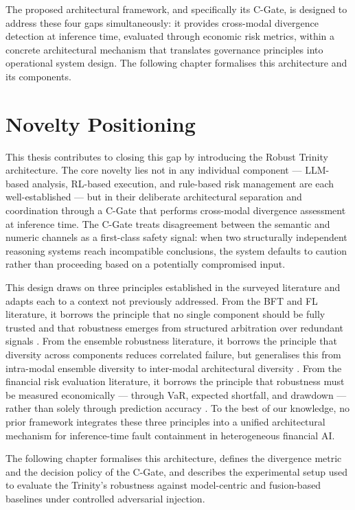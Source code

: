 The proposed architectural framework, and specifically its C-Gate, is designed
to address these four gaps simultaneously: it provides cross-modal divergence
detection at inference time, evaluated through economic risk metrics, within a
concrete architectural mechanism that translates governance principles into
operational system design. The following chapter formalises this architecture and
its components.

\section{Novelty Positioning}

This thesis contributes to closing this gap by introducing the Robust Trinity
architecture. The core novelty lies not in any individual component --- LLM-based
analysis, RL-based execution, and rule-based risk management are each
well-established --- but in their deliberate architectural separation and
coordination through a C-Gate that performs cross-modal
divergence assessment at inference time. The C-Gate treats disagreement between
the semantic and numeric channels as a first-class safety signal: when two
structurally independent reasoning systems reach incompatible conclusions, the
system defaults to caution rather than proceeding based on a potentially
compromised input.

This design draws on three principles established in the surveyed literature and
adapts each to a context not previously addressed. From the BFT and FL literature,
it borrows the principle that no single component should be fully trusted and that
robustness emerges from structured arbitration over redundant signals
\cite{castro1999pbft, devadoss_byzantine_2025, musa2025fedcwa}. From the ensemble robustness literature,
it borrows the principle that diversity across components reduces correlated failure,
but generalises this from intra-modal ensemble diversity to inter-modal architectural
diversity \cite{chen2024diversity, pang_improving_2019}. From the financial risk evaluation literature,
it borrows the principle that robustness must be measured economically --- through
VaR, expected shortfall, and drawdown --- rather than solely through prediction
accuracy \cite{baviskar2025robust, chen_standard_2025}. To the best of our knowledge, no prior
framework integrates these three principles into a unified architectural mechanism
for inference-time fault containment in heterogeneous financial AI.

The following chapter formalises this architecture, defines the divergence metric
and the decision policy of the C-Gate, and describes the experimental setup used to
evaluate the Trinity's robustness against model-centric and fusion-based baselines
under controlled adversarial injection.
